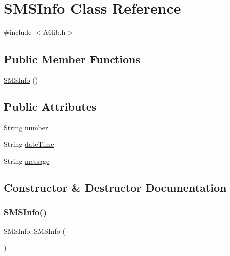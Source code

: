 \hypertarget{class_s_m_s_info}{}\section{S\+M\+S\+Info Class Reference}
\label{class_s_m_s_info}


{\ttfamily \#include $<$A6lib.\+h$>$}

\subsection*{Public Member Functions}
\begin{DoxyCompactItemize}
\item 
\mbox{\hyperlink{class_s_m_s_info_a2c5d2f255be91fb8582a5a33c3870a35}{S\+M\+S\+Info}} ()
\end{DoxyCompactItemize}
\subsection*{Public Attributes}
\begin{DoxyCompactItemize}
\item 
String \mbox{\hyperlink{class_s_m_s_info_ad4574e2c51baaf47d01e738b6f2ecf41}{number}}
\item 
String \mbox{\hyperlink{class_s_m_s_info_adad4d90acd6d7ab33904c929b7e629d6}{date\+Time}}
\item 
String \mbox{\hyperlink{class_s_m_s_info_aa6acfef8d31d0b57f04e3782faf550bb}{message}}
\end{DoxyCompactItemize}


\subsection{Constructor \& Destructor Documentation}
\mbox{\label{class_s_m_s_info_a2c5d2f255be91fb8582a5a33c3870a35}} 
\subsubsection{\texorpdfstring{S\+M\+S\+Info()}{SMSInfo()}}
{\footnotesize\ttfamily S\+M\+S\+Info\+::\+S\+M\+S\+Info (\begin{DoxyParamCaption}{ }\end{DoxyParamCaption})\hspace{0.3cm}{\ttfamily [inline]}}




